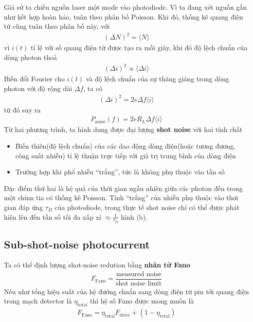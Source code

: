 \documentclass{report}
\newcommand{\q}[1]{``#1''}
\newcommand{\mean}[1]{\langle{#1}\rangle}
\newcommand{\f}[2]{\dfrac{#1}{#2}}
\begin{document}
Giả sử ta chiếu nguồn laser một mode vào photodiode. Vì ta đang xét nguồn gần như kết hợp hoàn hảo, tuân theo phân bố Poisson. Khi đó, thống kê quang điện tử cũng tuân theo phân bố này, với
\begin{gather}
	(\Delta N)^{2} = \mean{N}
\end{gather}
vì $i(t)$ tỉ lệ với số quang điện tử được tạo ra mỗi giây, khi đó độ lệch chuẩn của dòng photon thoả
\begin{gather}
	(\Delta i)^{2} \propto \mean{\Delta i}
\end{gather}
Biến đổi Fourier cho $i(t)$ và độ lệch chuẩn của sự thăng giáng trong dòng photon với độ rộng dải $\Delta f$, ta có
\begin{gather}
	(\Delta i)^{2} = 2e \Delta f \mean{i}
\end{gather}
từ đó suy ra
\begin{gather}
	P_{\text{noise}}(f) = 2 e R_{L} \Delta f \mean{i}
\end{gather}
Từ hai phương trình, ta hình dung được đại lượng \textbf{shot noise} với hai tính chất
\begin{itemize}
	\item Biến thiên(độ lệch chuẩn) của các dao động dòng điện(hoặc tương đương, công suất nhiễu) tỉ lệ thuận trực tiếp với giá trị trung bình của dòng điện
	\item Trường hợp khi phổ nhiễu \q{trắng}, tức là không phụ thuộc vào tần số
\end{itemize}
Đặc điểm thứ hai là hệ quả của thời gian ngẫu nhiên giữa các photon đến trong một chùm tia có thống kê Poisson. Tính \q{trắng} của nhiễu phụ thuộc vào thơi gian đáp ứng $\tau_D$ của photodiode, trong thực tế shot noise chỉ có thể được phát hiện lên đến tần số tối đa xấp xỉ $\approx \frac{1}{\tau_{D}}$ hình (b). 
\subsection{Sub-shot-noise photocurrent}
Ta có thể định lượng shot-noise redution bằng \textbf{nhân tử Fano}
\begin{gather}
	F_{\text{Fano}} = \f{\text{measured noise}}{\text{shot noise limit}}
\end{gather}
Nếu như tổng hiệu suất của hệ đường chuẩn sang dòng điện từ pin tới quang điện trong mạch detector là $\eta_{\text{total}}$ thì hệ số Fano được mong muốn là
\begin{gather}
	F_{\text{Fano}} = \eta_{\text{total}} F_{\text{drive}} + (1 - \eta_{\text{total}})
\end{gather}
\end{document}
